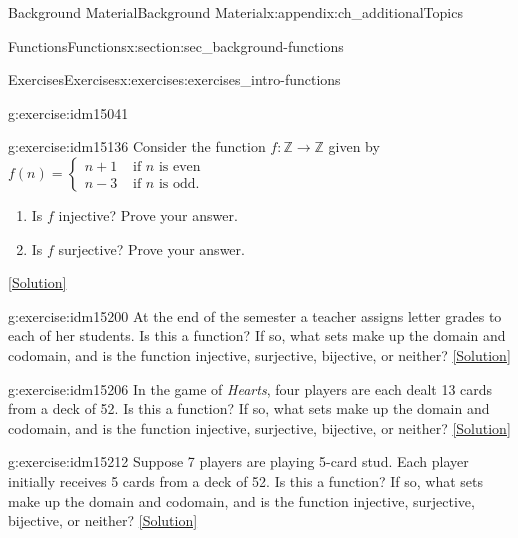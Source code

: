 \documentclass[oneside,10pt,]{book}
\numberwithin{equation}{chapter}
\def\Z{\mathbb Z}
\newcommand{\amp}{&}
\begin{document}
\begin{appendixptx}{Background Material}{}{Background Material}{}{}{x:appendix:ch_additionalTopics}
\begin{sectionptx}{Functions}{}{Functions}{}{}{x:section:sec_background-functions}
\begin{exercises-subsection}{Exercises}{}{Exercises}{}{}{x:exercises:exercises_intro-functions}
\begin{divisionexercise}{13}{}{}{g:exercise:idm15041}
\end{divisionexercise}%
\begin{divisionexercise}{14}{}{}{g:exercise:idm15136}%
Consider the function \(f:\Z \to \Z\) given by \(f(n) = \begin{cases}n+1 \amp  \text{ if }n\text{ is even} \\ n-3 \amp \text{ if }n\text{ is odd} . \end{cases}\)%
\begin{enumerate}[label=(\alph*)]
\item{}Is \(f\) injective? Prove your answer.%
\item{}Is \(f\) surjective? Prove your answer.%
\end{enumerate}
%
\space\hspace*{0pt}\hfill{\tiny\hyperlink{g:solution:idm15148-main}{[Solution]}}\end{divisionexercise}%
\begin{divisionexercise}{15}{}{}{g:exercise:idm15200}%
At the end of the semester a teacher assigns letter grades to each of her students. Is this a function? If so, what sets make up the domain and codomain, and is the function injective, surjective, bijective, or neither?%
\space\hspace*{0pt}\hfill{\tiny\hyperlink{g:solution:idm15203-main}{[Solution]}}\end{divisionexercise}%
\begin{divisionexercise}{16}{}{}{g:exercise:idm15206}%
In the game of \emph{Hearts}, four players are each dealt 13 cards from a deck of 52. Is this a function? If so, what sets make up the domain and codomain, and is the function injective, surjective, bijective, or neither?%
\space\hspace*{0pt}\hfill{\tiny\hyperlink{g:solution:idm15210-main}{[Solution]}}\end{divisionexercise}%
\begin{divisionexercise}{17}{}{}{g:exercise:idm15212}%
Suppose 7 players are playing 5-card stud. Each player initially receives 5 cards from a deck of 52. Is this a function? If so, what sets make up the domain and codomain, and is the function injective, surjective, bijective, or neither?%
\space\hspace*{0pt}\hfill{\tiny\hyperlink{g:solution:idm15215-main}{[Solution]}}\end{divisionexercise}%
\end{exercises-subsection}
\end{sectionptx}
%
%
\typeout{************************************************}

\end{appendixptx}
\end{document}
